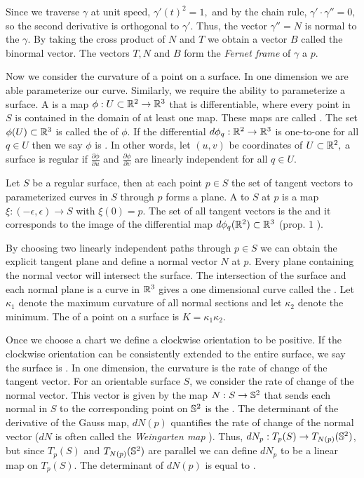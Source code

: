 Since we traverse $\gamma$
at unit speed, $\gamma'(t)^2=1,$ and by the chain rule, $\gamma'\cdot \gamma''=0,$
so  the second derivative is orthogonal to $\gamma'$. Thus, the
vector $\gamma''=N$ is normal to the $\gamma$. 
By taking the cross product of $N$ and $T$ we obtain a vector $B$ called
the binormal vector.
The vectors $T,N$ and $B$ form the \emph{Fernet frame} of $\gamma$ a $p.$

Now we consider the curvature of a point on a surface. In one dimension we are
able parameterize our curve. Similarly, we require the ability to parameterize a surface.
A  is a map $\phi:U\subset \mathbb{R}^2 \to \mathbb{R}^3$ that
is differentiable, where every point in $S$ is contained in the domain of at least one map.
These maps are called .
 The set $\phi(U)\subset \mathbb{R}^3$ is called the  of $\phi$.
If the differential $d\phi_q:\mathbb{R}^2\to \mathbb{R}^3$ is one-to-one for all $q\in U$ then
we say $\phi$ is . In other words, let $(u,v)$ be coordinates of $U\subset \mathbb{R}^2,$
a surface is regular if $\frac{\partial\phi}{\partial u}$
and $\frac{\partial\phi}{\partial v}$ are linearly independent for all $q\in U$.


Let $S$ be a regular surface, then at each point $p\in S$ the set of tangent vectors
to parameterized curves in $S$ through $p$ forms a plane.
A  to $S$ at $p$ is a map $\xi:(-\epsilon,\epsilon)\to S$ with $\xi(0)=p$.
The set of all tangent vectors is the  and it corresponds to the image
of the differential map $d\phi_q(\mathbb{R}^2)\subset \mathbb{R}^3$ (prop. 1 \cite{doc76}).


By choosing two linearly independent paths through $p\in S$ we can obtain the explicit tangent
plane and define a normal vector $N$ at $p$.
Every plane containing the normal vector will intersect the surface.
The intersection of the surface and each normal plane is a curve in $\mathbb{R}^3$
gives a one dimensional curve called the . 
Let $\kappa_1$ denote the maximum curvature of all normal sections 
and let $\kappa_2$ denote the minimum. 
The  of a point on a surface is
$K=\kappa_1\kappa_2.$



Once we choose a chart we define a clockwise orientation to be positive.
 If the clockwise
orientation can be consistently extended to the entire surface, we say
the surface is .
In one dimension, the curvature is the rate of change of the tangent vector.
For an orientable surface $S$, we consider the rate of change of the normal vector.
This vector is given by the map  $N:S\to \mathbb{S}^2$ that sends each
normal in $S$ to the corresponding point on $\mathbb{S}^2$ is
the .
The determinant of the derivative of the Gauss map, $dN(p)$ quantifies the rate of change of
the normal vector ($dN$ is often called the \emph{Weingarten map} \cite{Crane:2013}).
Thus, $dN_p:T_p(S)\to T_{N(p)}(\mathbb{S}^2)$, but since $T_p(S)$ and $T_{N(p)}(\mathbb{S}^2)$
are parallel we can define $dN_p$ to be a linear map on $T_p(S)$.
The determinant of $dN(p)$ is equal to .



